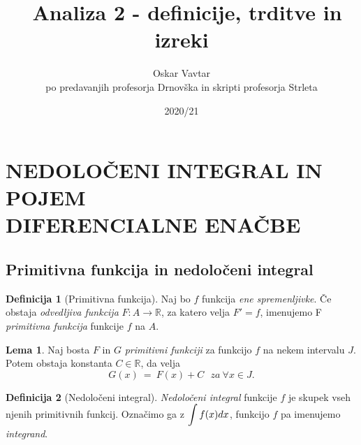 \documentclass[11pt]{article}
\title{\Left\Homer ~Analiza 2 - definicije, trditve in izreki \Bart}
\author{Oskar Vavtar \\
po predavanjih profesorja Drnovška in skripti profesorja Strleta}
\date{2020/21}
\theoremstyle{definition}
\newtheorem{definicija}{Definicija}[section]
\theoremstyle{definition}
\theoremstyle{definition}
\theoremstyle{theorem}
\newtheorem{lema}{Lema}
\begin{document}
\maketitle
\pagebreak
\tableofcontents
\pagebreak


\section{NEDOLOČENI INTEGRAL IN POJEM \\ DIFERENCIALNE ENAČBE}
\vspace{0.5cm}


\subsection{Primitivna funkcija in nedoločeni integral}
\vspace{0.5cm}

\begin{definicija}[Primitivna funkcija]

Naj bo $f$ funkcija \textit{ene spremenljivke}. Če obstaja \textit{odvedljiva funkcija} $F: A \rightarrow \mathbb{R}$, za katero velja $F' = f$, imenujemo F \textit{primitivna funkcija} funkcije $f$ na $A$. 

\end{definicija}
\vspace{0.5cm}

\begin{lema}

Naj bosta $F$ in $G$ \textit{primitivni funkciji} za funkcijo $f$ na nekem intervalu $J$. Potem obstaja konstanta $C \in \mathbb{R}$, da velja 
$$G(x) ~=~ F(x) + C ~~~\textit{za}~ \forall x \in J.$$

\end{lema}
\vspace{0.5cm}

\begin{definicija}[Nedoločeni integral]

\textit{Nedoločeni integral} funkcije $f$ je skupek vseh njenih primitivnih funkcij. Označimo ga z $\mathlarger{\int f(x) dx}$, funkcijo $f$ pa imenujemo \textit{integrand}.

\end{definicija}
\end{document}
